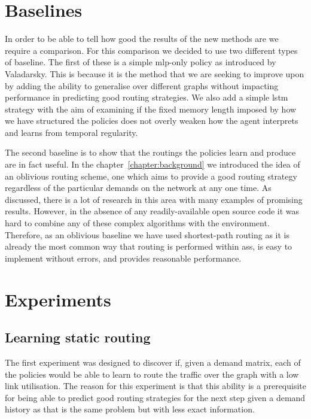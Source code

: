 \section{Baselines}
In order to be able to tell how good the results of the new methods are we require a comparison. For this comparison we decided to use two different types of baseline. The first of these is a simple \ac{mlp}-only policy as introduced by Valadarsky. This is because it is the method that we are seeking to improve upon by adding the ability to generalise over different graphs without impacting performance in predicting good routing strategies. We also add a simple \ac{lstm} strategy with the aim of examining if the fixed memory length imposed by how we have structured the policies does not overly weaken how the agent interprets and learns from temporal regularity.

The second baseline is to show that the routings the policies learn and produce are in fact useful. In the chapter~\ref{chapter:background} we introduced the idea of an oblivious routing scheme, one which aims to provide a good routing strategy regardless of the particular demands on the network at any one time. As discussed, there is a lot of research in this area with many examples of promising results. However, in the absence of any readily-available open source code it was hard to combine any of these complex algorithms with the environment. Therefore, as an oblivious baseline we have used shortest-path routing as it is already the most common way that routing is performed within \acp{as}, is easy to implement without errors, and provides reasonable performance.

\section{Experiments}

\subsection{Learning static routing}
\label{section:exp_static}
The first experiment was designed to discover if, given a demand matrix, each of the policies would be able to learn to route the traffic over the graph with a low link utilisation. The reason for this experiment is that this ability is a prerequisite for being able to predict good routing strategies for the next step given a demand history as that is the same problem but with less exact information.

